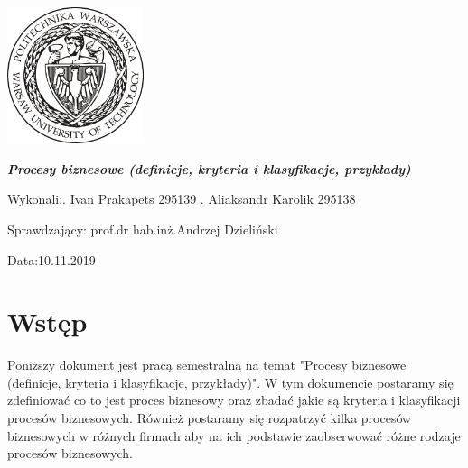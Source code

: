 \documentclass[a4paper, 12pt]{article}
\newcommand{\mainmatter}{\clearpage \cfoot{\thepage\ of \pageref{LastPage}}
\pagenumbering{arabic}}
\begin{document}
	\begin{titlepage}
\includegraphics[width = 40mm]{logo.jpg}
		\begin{center}
    			\vspace{3cm}
    					\Large\textit{\textbf{Procesy biznesowe (definicje, kryteria i klasyfikacje, przykłady)}}
   			\vspace{4cm}
		\end{center} 

		\hfill\begin{minipage}{0.54\textwidth}
			\Large Wykonali:. Ivan Prakapets 295139 . Aliaksandr Karolik 295138
		\vspace{\baselineskip}
		\end{minipage}
		
		\hfill\begin{minipage}{0.54\textwidth}
			\Large Sprawdzający:\newline
		 		prof.dr hab.inż.Andrzej Dzieliński
\vspace{\baselineskip}
		\end{minipage}

		\hfill\begin{minipage}{0.54\textwidth}
			\Large Data:10.11.2019
			\vspace{\baselineskip}
		\end{minipage}
	\end{titlepage}
\newpage
\mainmatter
\setlength{\headheight}{15pt}
\doublespacing
\tableofcontents
\newpage

\linespread{0.5}

\section{Wstęp}
\hspace*{1 cm}Poniższy dokument jest  pracą semestralną na temat "Procesy biznesowe (definicje, kryteria i klasyfikacje, przykłady)". W tym dokumencie postaramy się zdefiniować co to jest proces biznesowy oraz zbadać jakie są kryteria i klasyfikacji procesów biznesowych. Również postaramy się rozpatrzyć kilka procesów biznesowych w różnych firmach aby na ich podstawie zaobserwować różne rodzaje procesów biznesowych. 
\end{document}
